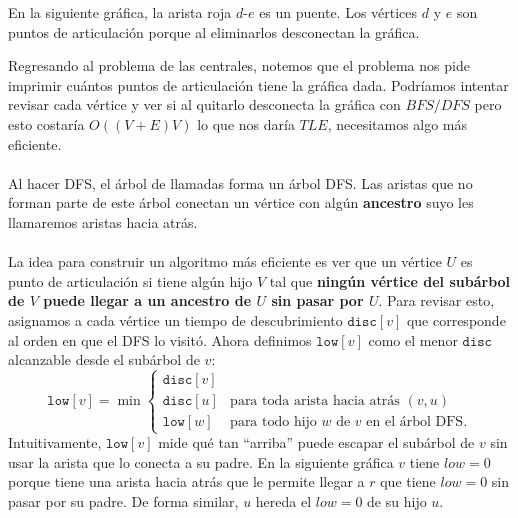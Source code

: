 En la siguiente gráfica, la arista roja $d$-$e$ es un puente. Los vértices $d$ y $e$ son puntos de articulación porque al eliminarlos desconectan la gráfica.
\begin{figure}[H]
\centering
{}
\end{figure}
Regresando al problema de las centrales, notemos que el problema nos pide imprimir cuántos puntos de articulación tiene la gráfica dada. Podríamos intentar revisar cada vértice y ver si al quitarlo desconecta la gráfica con $BFS/DFS$ pero esto costaría $O((V+E)V)$ lo que nos daría $TLE$, necesitamos algo más eficiente.
\\\\
Al hacer DFS, el árbol de llamadas forma un árbol DFS. Las
aristas que no forman parte de este árbol conectan un vértice con algún \textbf{ancestro} suyo les llamaremos aristas hacia atrás.
\\\\
La idea para construir un algoritmo más eficiente es ver que un vértice $U$ es punto de articulación si tiene algún hijo $V$ tal que
\textbf{ningún vértice del subárbol de $V$ puede llegar a un ancestro de
$U$ sin pasar por $U$}. Para revisar esto, asignamos a cada vértice
un tiempo de descubrimiento $\texttt{disc}[v]$ que corresponde al orden
en que el DFS lo visitó. Ahora definimos $\texttt{low}[v]$ como el menor $\texttt{disc}$ alcanzable desde el subárbol de $v$:
\[
\texttt{low}[v] = \min \begin{cases}
\texttt{disc}[v] \\
\texttt{disc}[u] & \text{para toda arista hacia atrás } (v,u) \\
\texttt{low}[w] & \text{para todo hijo } w \text{ de } v \text{ en el árbol DFS}.
\end{cases}
\]
Intuitivamente, $\texttt{low}[v]$ mide qué tan ``arriba'' puede
escapar el subárbol de $v$ sin usar la arista que lo conecta a su padre. En la siguiente gráfica $v$ tiene $low=0$ porque tiene una arista hacia atrás que le permite llegar a $r$ que tiene $low=0$ sin pasar por su padre. De forma similar, $u$ hereda el $low=0$ de su hijo $u$.
 
